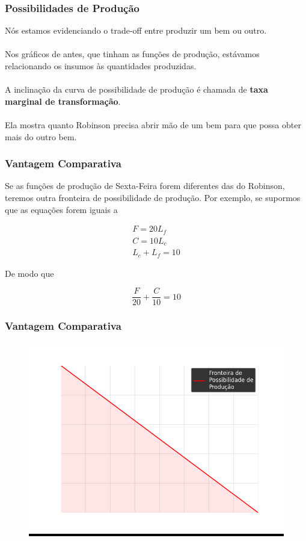\documentclass{beamer}[10]
\begin{document}
\begin{frame}
	\frametitle{Possibilidades de Produção}

	Nós estamos evidenciando o trade-off entre produzir um bem ou outro.
	\\~\\
	Nos gráficos de antes, que tinham as funções de produção, estávamos relacionando os insumos às quantidades produzidas.
	\\~\\
	A inclinação da curva de possibilidade de produção é chamada de \textbf{taxa marginal de transformação}.
	\\~\\
	Ela mostra quanto Robinson precisa abrir mão de um bem para que possa obter mais do outro bem.

\end{frame}

\begin{frame}
	\frametitle{Vantagem Comparativa}

	Se as funções de produção de Sexta-Feira forem diferentes das do Robinson, teremos outra fronteira de possibilidade de produção. Por exemplo, se supormos que as equações forem iguais a 

	\begin{equation*}
		\begin{split}
			F = 20L_f \\
			C = 10L_c \\
			L_c + L_f = 10
		\end{split}
	\end{equation*}

	De modo que

	$$\frac{F}{20} + \frac{C}{10} = 10$$

\end{frame}

\begin{frame}
	\frametitle{Vantagem Comparativa}

	\begin{figure}[H]
		\centering
		\colorbox{black}{\includegraphics[scale=0.6]{cap33_10-pos_prod1.png}}
	\end{figure}

\end{frame}
\end{document}
